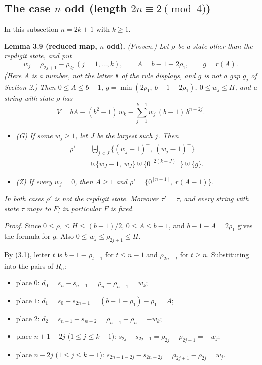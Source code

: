 \documentclass[11pt,letterpaper]{article}
\providecommand{\tightlist}{%
  \setlength{\itemsep}{0pt}\setlength{\parskip}{0pt}}
\theoremstyle{paperstyle}
\theoremstyle{paperstyledef}
\theoremstyle{paperstylerem}
\begin{document}
\subsection{\texorpdfstring{The case \(n\) odd (length \(2n \equiv 2 \pmod 4\))}{The case n odd (length 2n \textbackslash equiv 2 \textbackslash pmod 4)}}\label{the-case-n-odd-length-2n-equiv-2-pmod-4}

In this subsection \(n = 2k + 1\) with \(k \geq 1\).

\textbf{Lemma 3.9 (reduced map, \(n\) odd).} \emph{(Proven.) Let \(\rho\) be a state other than the repdigit state, and put} \[w_j = \rho_{2j+1} - \rho_{2j} \ (j = 1, \dots, k), \qquad A = b - 1 - 2\rho_1, \qquad g = r(A).\] \emph{(Here \(A\) is a number, not the letter \(\mathtt{A}\) of the rule displays, and \(g\) is not a gap \(g_j\) of Section 2.) Then \(0 \leq A \leq b-1\), \(g = \min(2\rho_1,\ b-1-2\rho_1)\), \(0 \leq w_j \leq H\), and a string with state \(\rho\) has} \[V = bA - (b^2 - 1)\, w_k - \sum_{j=1}^{k-1} w_j\, (b-1)\, b^{n-2j}.\]

\begin{itemize}
\tightlist
\item
  \emph{(G) If some \(w_j \geq 1\), let \(J\) be the largest such \(j\). Then} \[\begin{aligned} \rho' = {} & \biguplus_{j<J} \{(w_j - 1)^+,\ (w_j - 1)^+\} \\ & \uplus \{w_J - 1,\ w_J\} \uplus \{0^{[2(k-J)]}\} \uplus \{g\}. \end{aligned}\]
\item
  \emph{(Z) If every \(w_j = 0\), then \(A \geq 1\) and \(\rho' = \{0^{[n-1]},\ r(A-1)\}\).}
\end{itemize}

\emph{In both cases \(\rho'\) is not the repdigit state. Moreover \(\tau' = \tau\), and every string with state \(\tau\) maps to \(F\); in particular \(F\) is fixed.}

\emph{Proof.} Since \(0 \leq \rho_1 \leq H \leq (b-1)/2\), \(0 \leq A \leq b-1\), and \(b - 1 - A = 2\rho_1\) gives the formula for \(g\). Also \(0 \leq w_j \leq \rho_{2j+1} \leq H\).

By (3.1), letter \(t\) is \(b - 1 - \rho_{t+1}\) for \(t \leq n-1\) and \(\rho_{2n-t}\) for \(t \geq n\). Substituting into the pairs of \(R_n\):

\begin{itemize}
\tightlist
\item
  place \(0\): \(d_0 = s_n - s_{n+1} = \rho_n - \rho_{n-1} = w_k\);
\item
  place \(1\): \(d_1 = s_0 - s_{2n-1} = (b-1-\rho_1) - \rho_1 = A\);
\item
  place \(2\): \(d_2 = s_{n-1} - s_{n-2} = \rho_{n-1} - \rho_n = -w_k\);
\item
  place \(n+1-2j\) (\(1 \leq j \leq k-1\)): \(s_{2j} - s_{2j-1} = \rho_{2j} - \rho_{2j+1} = -w_j\);
\item
  place \(n-2j\) (\(1 \leq j \leq k-1\)): \(s_{2n-1-2j} - s_{2n-2j} = \rho_{2j+1} - \rho_{2j} = w_j\).
\end{itemize}
\end{document}
